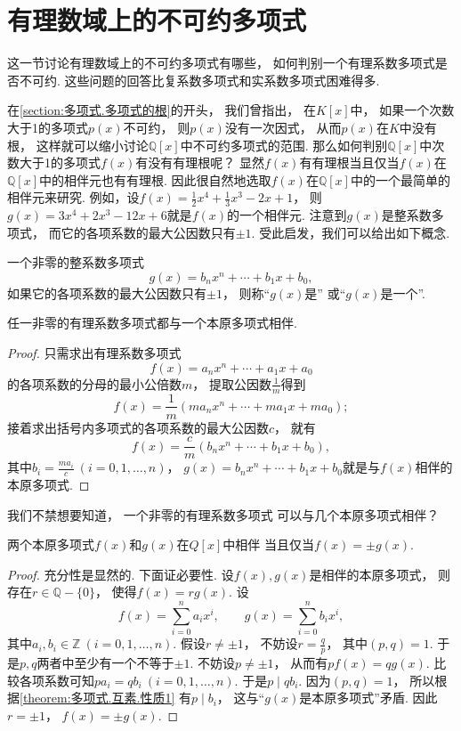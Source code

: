 \section{有理数域上的不可约多项式}
这一节讨论有理数域上的不可约多项式有哪些，
如何判别一个有理系数多项式是否不可约.
这些问题的回答比复系数多项式和实系数多项式困难得多.

在\cref{section:多项式.多项式的根}的开头，
我们曾指出，
在\(K[x]\)中，
如果一个次数大于1的多项式\(p(x)\)不可约，
则\(p(x)\)没有一次因式，
从而\(p(x)\)在\(K\)中没有根，
这样就可以缩小讨论\(\mathbb{Q}[x]\)中不可约多项式的范围.
那么如何判别\(\mathbb{Q}[x]\)中次数大于1的多项式\(f(x)\)有没有有理根呢？
显然\(f(x)\)有有理根当且仅当\(f(x)\)在\(\mathbb{Q}[x]\)中的相伴元也有有理根.
因此很自然地选取\(f(x)\)在\(\mathbb{Q}[x]\)中的一个最简单的相伴元来研究.
例如，设\(f(x)=\frac12x^4+\frac13x^3-2x+1\)，
则\(g(x)=3x^4+2x^3-12x+6\)就是\(f(x)\)的一个相伴元.
注意到\(g(x)\)是整系数多项式，
而它的各项系数的最大公因数只有\(\pm1\).
受此启发，我们可以给出如下概念.

\begin{definition}
一个非零的整系数多项式\[
	g(x)=b_n x^n+\dotsb+b_1 x+b_0,
\]
如果它的各项系数的最大公因数只有\(\pm1\)，
则称“\(g(x)\)是”
或“\(g(x)\)是一个”.
\end{definition}

\begin{proposition}
任一非零的有理系数多项式都与一个本原多项式相伴.
\begin{proof}
只需求出有理系数多项式\[
	f(x)=a_n x^n+\dotsb+a_1 x+a_0
\]的各项系数的分母的最小公倍数\(m\)，
提取公因数\(\frac1m\)得到\[
	f(x)=\frac1m(m a_n x^n+\dotsb+m a_1 x+m a_0);
\]
接着求出括号内多项式的各项系数的最大公因数\(c\)，
就有\[
	f(x)=\frac{c}{m}(b_n x^n+\dotsb+b_1 x+b_0),
\]
其中\(b_i=\frac{m a_i}{c}\ (i=0,1,\dotsc,n)\)，
\(g(x)=b_n x^n+\dotsb+b_1 x+b_0\)就是与\(f(x)\)相伴的本原多项式.
\end{proof}
\end{proposition}

我们不禁想要知道，
一个非零的有理系数多项式
可以与几个本原多项式相伴？

\begin{lemma}\label{theorem:多项式.有理数域上的不可约多项式.引理1}
两个本原多项式\(f(x)\)和\(g(x)\)在\(Q[x]\)中相伴
当且仅当\(f(x)=\pm g(x)\).
\begin{proof}
充分性是显然的.
下面证必要性.
设\(f(x),g(x)\)是相伴的本原多项式，
则存在\(r\in\mathbb{Q}-\{0\}\)，
使得\(f(x)=r g(x)\).
设\[
	f(x)=\sum_{i=0}^n a_i x^i, \qquad
	g(x)=\sum_{i=0}^n b_i x^i,
\]
其中\(a_i,b_i\in\mathbb{Z}\ (i=0,1,\dotsc,n)\).
假设\(r\neq\pm1\)，
不妨设\(r=\frac{q}{p}\)，
其中\((p,q)=1\).
于是\(p,q\)两者中至少有一个不等于\(\pm1\).
不妨设\(p\neq\pm1\)，
从而有\(p f(x)=q g(x)\).
比较各项系数可知\(p a_i=q b_i\ (i=0,1,\dotsc,n)\).
于是\(p \mid q b_i\).
因为\((p,q)=1\)，
所以根据\cref{theorem:多项式.互素.性质1}
有\(p \mid b_i\)，
这与“\(g(x)\)是本原多项式”矛盾.
因此\(r=\pm1\)，
\(f(x)=\pm g(x)\).
\end{proof}
\end{lemma}

